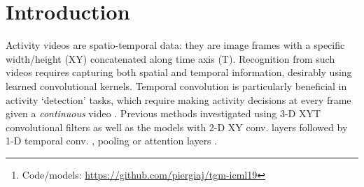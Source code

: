 \documentclass{article}
\begin{document}

\printAffiliationsAndNotice{}  

\begin{abstract}
We introduce a new convolutional layer named the \emph{Temporal Gaussian Mixture} (TGM) layer and present how it can be used to efficiently capture longer-term temporal information in continuous activity videos. The TGM layer is a temporal convolutional layer governed by a much smaller set of parameters (e.g., location/variance of Gaussians) that are fully differentiable. We present our fully convolutional video models with multiple TGM layers for activity detection. The extensive experiments on multiple datasets, including Charades and MultiTHUMOS, confirm the effectiveness of TGM layers, significantly outperforming the state-of-the-arts\footnote{Code/models: \href{https://github.com/piergiaj/tgm-icml19}{https://github.com/piergiaj/tgm-icml19}}.


\end{abstract}


\section{Introduction}

Activity videos are spatio-temporal data: they are image frames with a specific width/height (XY) concatenated along time axis (T). Recognition from such videos requires capturing both spatial and temporal information, desirably using learned convolutional kernels. Temporal convolution is particularly beneficial in activity `detection' tasks, which require making activity decisions at every frame given a \emph{continuous} video \citep{sigurdsson2016hollywood,yeung2015every}. Previous methods investigated using 3-D XYT convolutional filters \citep{tran2014c3d,carreira2017quo} as well as the models with 2-D XY conv. layers followed by 1-D temporal conv. \citep{tran18closer}, pooling or attention layers \citep{piergiovanni2017learning}.
\end{document}
